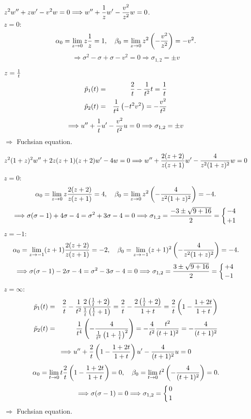 {\begin{enumerate}
\bigskip

 $\displaystyle z^2w''+zw'-v^2w=0\Longrightarrow
w''+{1\over z}w'-{v^2\over z^2}w=0$.\\[2ex]
 {$z=0$:}
$$
   \alpha_0=\lim_{z\to0}z{1\over z}=1,\quad
   \beta_0=\lim_{z\to0}z^2\left(-{v^2\over z^2}\right)=-v^2.
$$
$$
   \Longrightarrow \sigma^2-\sigma+\sigma-v^2=0\Longrightarrow\sigma_{1,2}=
   \pm v
$$

\bigskip

 $  z={1\over t}$
\begin{eqnarray*}
   \tilde p_1(t)&=&{2\over t}-{1\over t^2}t={1\over t}\\
   \tilde p_2(t)&=&{1\over t^4}\left(-t^2v^2\right)=-{v^2\over t^2}
\end{eqnarray*}
$$
   \Longrightarrow u''+{1\over t}u'-{v^2\over t^2}u=0 \Longrightarrow
   \sigma_{1,2}=\pm v
$$
$\Longrightarrow$ Fuchsian equation.

\bigskip

$$
   z^2(1+z)^2w''+2z(z+1)(z+2)w'-4w=0\Longrightarrow
   w''+{2(z+2)\over z(z+1)}w'-{4\over z^2(1+z)^2}w=0
$$
 {$z=0$:}
$$
   \alpha_0=\lim_{z\to0}z{2(z+2)\over z(z+1)}=4,\quad
   \beta_0=\lim_{z\to0}z^2\left(-{4\over z^2(1+z)^2}\right)=-4.
$$
$$
   \Longrightarrow\sigma(\sigma-1)+4\sigma-4=\sigma^2+3\sigma-4=0
   \Longrightarrow\sigma_{1,2}=
   {-3\pm\sqrt{9+16}\over 2}=\left\{{-4\atop +1}\right.
$$
 {$z=-1$:}
$$
   \alpha_0=\lim_{z\to-1}(z+1){2(z+2)\over z(z+1)}=-2,\quad
   \beta_0=\lim_{z\to-1}(z+1)^2\left(-{4\over z^2(1+z)^2}\right)=-4.
$$
$$
   \Longrightarrow\sigma(\sigma-1)-2\sigma-4=\sigma^2-3\sigma-4=
   0\Longrightarrow\sigma_{1,2}=
   {3\pm\sqrt{9+16}\over 2}=\left\{{+4\atop -1}\right.
$$
 {$z=\infty$:}
\begin{eqnarray*}
   \tilde p_1(t)&=&{2\over t}-{1\over t^2}{2\left({1\over t}+2\right)
                   \over {1\over t}\left({1\over t}+1\right)}=
                   {2\over t}-{2\left({1\over t}+2\right)\over
                   1+t}={2\over t}\left(1-{1+2t\over 1+t}\right)\\
   \tilde p_2(t)&=&{1\over t^4}\left(-{4\over{1\over t^2}
                   \left(1+{1\over t}\right)^2}\right)=-{4\over t^2}
                   {t^2\over(t+1)^2}=-{4\over(t+1)^2}
\end{eqnarray*}
$$
   \Longrightarrow u''+{2\over t}\left(1-{1+2t\over1+t}\right)u'-
   {4\over(t+1)^2}u=0
$$
$$
   \alpha_0=\lim_{t\to0}t{2\over t}\left(1-{1+2t\over1+t}\right)=0,\quad
   \beta_0=\lim_{t\to0}t^2\left(-{4\over (t+1)^2}\right)=0.
$$
$$
   \Longrightarrow\sigma(\sigma-1)=0\Longrightarrow\sigma_{1,2}=
   \left\{{0\atop 1}\right.
$$
$\Longrightarrow$ Fuchsian equation.


\end{enumerate}}
